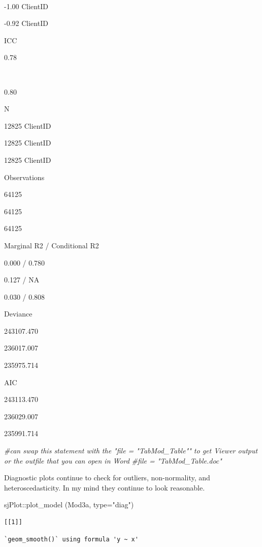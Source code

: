 \documentclass[
  11pt,
]{book}
\newenvironment{Shaded}{\begin{snugshade}}{\end{snugshade}}
\newcommand{\AttributeTok}[1]{\textcolor[rgb]{0.77,0.63,0.00}{#1}}
\newcommand{\CommentTok}[1]{\textcolor[rgb]{0.56,0.35,0.01}{\textit{#1}}}
\newcommand{\FunctionTok}[1]{\textcolor[rgb]{0.00,0.00,0.00}{#1}}
\newcommand{\NormalTok}[1]{#1}
\newcommand{\SpecialCharTok}[1]{\textcolor[rgb]{0.00,0.00,0.00}{#1}}
\newcommand{\StringTok}[1]{\textcolor[rgb]{0.31,0.60,0.02}{#1}}
\begin{document}
~

-1.00 ClientID

-0.92 ClientID

ICC

0.78

~

0.80

N

12825 ClientID

12825 ClientID

12825 ClientID

Observations

64125

64125

64125

Marginal R2 / Conditional R2

0.000 / 0.780

0.127 / NA

0.030 / 0.808

Deviance

243107.470

236017.007

235975.714

AIC

243113.470

236029.007

235991.714

\begin{Shaded}
\begin{Highlighting}[]
\CommentTok{\#can swap this statement with the "file = "TabMod\_Table"" to get Viewer output or the outfile that you can open in Word}
\CommentTok{\#file = "TabMod\_Table.doc"}
\end{Highlighting}
\end{Shaded}

Diagnostic plots continue to check for outliers, non-normality, and heteroscedasticity. In my mind they continue to look reasonable.

\begin{Shaded}
\begin{Highlighting}[]
\NormalTok{sjPlot}\SpecialCharTok{::}\FunctionTok{plot\_model}\NormalTok{ (Mod3a, }\AttributeTok{type=}\StringTok{"diag"}\NormalTok{)}
\end{Highlighting}
\end{Shaded}

\begin{verbatim}
[[1]]
\end{verbatim}

\begin{verbatim}
`geom_smooth()` using formula 'y ~ x'
\end{verbatim}
\end{document}

